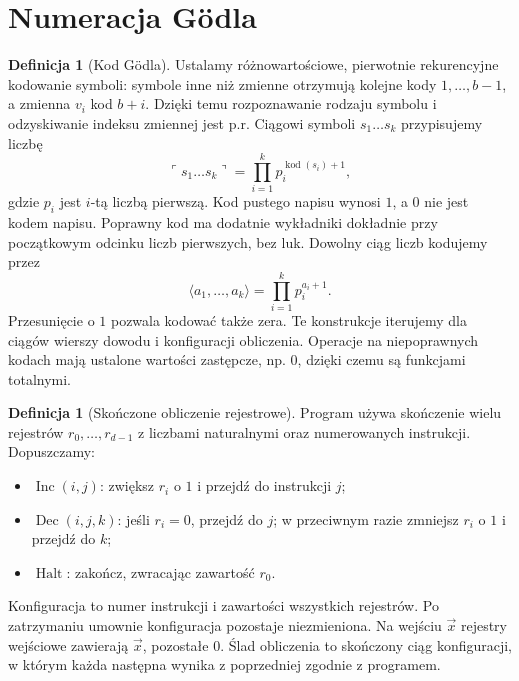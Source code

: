 \documentclass[11pt,a4paper]{article}
\numberwithin{equation}{section}
\theoremstyle{plain}
\theoremstyle{definition}
\newtheorem{definicja}[twierdzenie]{Definicja}
\theoremstyle{remark}
\begin{document}
\section{Numeracja Gödla}\label{sec:numeracja-godla}
\begin{definicja}[Kod Gödla]\label{res:6:1}
Ustalamy różnowartościowe, pierwotnie rekurencyjne kodowanie symboli: symbole inne niż zmienne otrzymują kolejne kody $1,\ldots,b-1$, a zmienna $v_i$ kod $b+i$. Dzięki temu rozpoznawanie rodzaju symbolu i odzyskiwanie indeksu zmiennej jest p.r. Ciągowi symboli $s_1\ldots s_k$ przypisujemy liczbę
\[
\ulcorner s_1\ldots s_k\urcorner=\prod_{i=1}^k p_i^{\operatorname{kod}(s_i)+1},
\]
gdzie $p_i$ jest $i$-tą liczbą pierwszą. Kod pustego napisu wynosi $1$, a $0$ nie jest kodem napisu. Poprawny kod ma dodatnie wykładniki dokładnie przy początkowym odcinku liczb pierwszych, bez luk. Dowolny ciąg liczb kodujemy przez
\[
\langle a_1,\ldots,a_k\rangle=\prod_{i=1}^k p_i^{a_i+1}.
\]
Przesunięcie o $1$ pozwala kodować także zera. Te konstrukcje iterujemy dla ciągów wierszy dowodu i konfiguracji obliczenia. Operacje na niepoprawnych kodach mają ustalone wartości zastępcze, np. $0$, dzięki czemu są funkcjami totalnymi.
\end{definicja}

\begin{definicja}[Skończone obliczenie rejestrowe]\label{res:6:2}
Program używa skończenie wielu rejestrów $r_0,\ldots,r_{d-1}$ z liczbami naturalnymi oraz numerowanych instrukcji. Dopuszczamy:
\begin{itemize}
\item $\operatorname{Inc}(i,j)$: zwiększ $r_i$ o $1$ i przejdź do instrukcji $j$;
\item $\operatorname{Dec}(i,j,k)$: jeśli $r_i=0$, przejdź do $j$; w przeciwnym razie zmniejsz $r_i$ o $1$ i przejdź do $k$;
\item $\operatorname{Halt}$: zakończ, zwracając zawartość $r_0$.
\end{itemize}
Konfiguracja to numer instrukcji i zawartości wszystkich rejestrów. Po zatrzymaniu umownie konfiguracja pozostaje niezmieniona. Na wejściu $\vec x$ rejestry wejściowe zawierają $\vec x$, pozostałe $0$. Ślad obliczenia to skończony ciąg konfiguracji, w którym każda następna wynika z poprzedniej zgodnie z programem.
\end{definicja}
\end{document}
